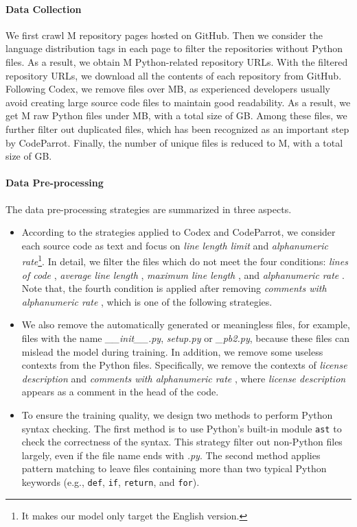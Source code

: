 \documentclass{article}
\begin{document}
\paragraph{Data Collection}
We first crawl M repository pages hosted on GitHub. Then we consider the language distribution tags in each page to filter the repositories without Python files. As a result, we obtain M Python-related repository URLs. With the filtered repository URLs, we download all the contents of each repository from GitHub. Following Codex, we remove files over MB, as experienced developers usually avoid creating large source code files to maintain good readability. As a result, we get M raw Python files under MB, with a total size of GB. Among these files, we further filter out duplicated files, which has been recognized as an important step by CodeParrot.
Finally, the number of unique files is reduced to M, with a total size of GB.

\paragraph{Data Pre-processing}
The data pre-processing strategies are summarized in three aspects.
\begin{itemize}
    \item According to the strategies applied to Codex and CodeParrot, we consider each source code as text and focus on \textit{line length limit} and \textit{alphanumeric rate}\footnote{It makes our model only target the English version.}. In detail, we filter the files which do not meet the four conditions: \textit{lines of code} , \textit{average line length} , \textit{maximum line length} , and \textit{alphanumeric rate} . Note that, the fourth condition is applied after removing \textit{comments with alphanumeric rate} , which is one of the following strategies.
    
    \item We also remove the automatically generated or meaningless files, for example, files with the name \textit{\_\_init\_\_.py}, \textit{setup.py} or \textit{\_pb2.py}, because these files can mislead the model during training. In addition, we remove some useless contexts from the Python files. Specifically, we remove the contexts of \textit{license description} and \textit{comments with alphanumeric rate  }, where \textit{license description} appears as a comment in the head of the code.
    \item 
    To ensure the training quality, we design two methods to perform Python syntax checking. The first method is to use Python's built-in module \verb|ast| to check the correctness of the syntax. This strategy filter out non-Python files largely, even if the file name ends with \textit{.py}. The second method applies pattern matching to leave files containing more than two typical Python keywords (e.g., \verb|def|, \verb|if|, \verb|return|, and \verb|for|).
\end{itemize}
\end{document}
